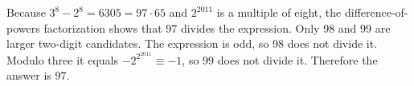 Because $3^8-2^8=6305=97\cdot65$ and $2^{2011}$ is a multiple of eight, the difference-of-powers factorization shows that 97 divides the expression. Only 98 and 99 are larger two-digit candidates. The expression is odd, so 98 does not divide it. Modulo three it equals $-2^{2^{2011}}\equiv-1$, so 99 does not divide it. Therefore the answer is $\boxed{97}$.
